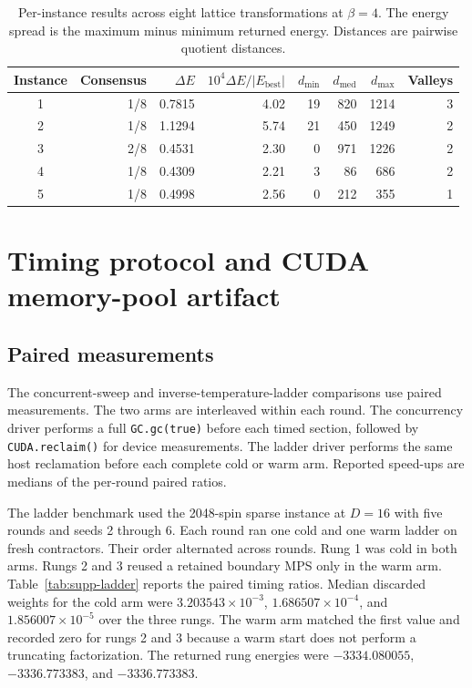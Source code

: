 \documentclass[preprint,12pt,a4paper]{elsarticle}
\begin{document}
\begin{table}[htbp]
\small
\centering
\caption{Per-instance results across eight lattice transformations at
$\beta=4$. The energy spread is the maximum minus minimum returned energy.
Distances are pairwise quotient distances.}
\label{tab:supp-transform-diversity}
\begin{tabular}{@{}crrrrrrr@{}}
\toprule
Instance & Consensus & $\Delta E$ &
$10^4\Delta E/|E_{\mathrm{best}}|$ &
$d_{\min}$ & $d_{\mathrm{med}}$ & $d_{\max}$ & Valleys \\
\midrule
1 & 1/8 & 0.7815 & 4.02 & 19 & 820 & 1214 & 3 \\
2 & 1/8 & 1.1294 & 5.74 & 21 & 450 & 1249 & 2 \\
3 & 2/8 & 0.4531 & 2.30 & 0  & 971 & 1226 & 2 \\
4 & 1/8 & 0.4309 & 2.21 & 3  & 86  & 686  & 2 \\
5 & 1/8 & 0.4998 & 2.56 & 0  & 212 & 355  & 1 \\
\bottomrule
\end{tabular}
\end{table}
\FloatBarrier

\section{Timing protocol and CUDA memory-pool artifact}
\label{sec:supp-timing}

\subsection{Paired measurements}

The concurrent-sweep and inverse-temperature-ladder comparisons use paired
measurements. The two arms are interleaved within each round. The concurrency
driver performs a full \texttt{GC.gc(true)} before each timed section, followed
by \texttt{CUDA.reclaim()} for device measurements. The ladder driver performs
the same host reclamation before each complete cold or warm arm. Reported
speed-ups are medians of the per-round paired ratios.

The ladder benchmark used the 2048-spin sparse instance at $D=16$ with five
rounds and seeds 2 through 6. Each round ran one cold and one warm ladder on
fresh contractors. Their order alternated across rounds. Rung 1 was cold in
both arms. Rungs 2 and 3 reused a retained boundary MPS only in the warm arm.
Table~\ref{tab:supp-ladder} reports the paired timing ratios. Median discarded
weights for the cold arm were $3.203543\times10^{-3}$,
$1.686507\times10^{-4}$, and $1.856007\times10^{-5}$ over the three rungs. The
warm arm matched the first value and recorded zero for rungs 2 and 3 because a
warm start does not perform a truncating factorization. The returned rung
energies were $-3334.080055$, $-3336.773383$, and $-3336.773383$.
\end{document}
